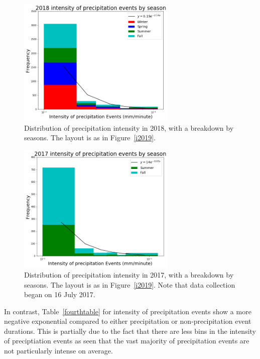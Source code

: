 \documentclass[11pt]{report}
\begin{document}
\clearpage
\begin{figure}[t]
\centering
\includegraphics[width=0.675\textwidth]{Figures/inten2018.png}
\caption[Intensity histogram for 2018 broken down by season]
        {\label{i2018}Distribution of precipitation intensity in 2018,
          with a breakdown by seasons. The layout is as in
          Figure~\ref{i2019}.}
\end{figure}

\begin{figure}[b]
\centering
\includegraphics[width=0.675\textwidth]{Figures/inten2017.png}
\caption[Intensity histogram for 2017 broken down by season]
        {\label{i2017}Distribution of precipitation intensity in 2017,
          with a breakdown by seasons. The layout is as in
          Figure~\ref{i2019}. Note that data collection began on 16
          July 2017.}
\end{figure}
\clearpage






In contrast, Table~\ref{fourthtable} for intensity of precipitation events show a more negative exponential compared to either precipitation or non-precipitation event durations. This is partially due to the fact that there are less bins in the intensity of preciptiation events as seen that the vast majority of precipitation events are not particularly intense on average. 
\end{document}
